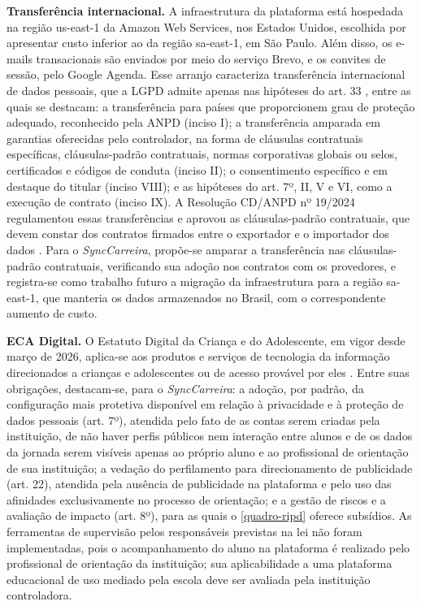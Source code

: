 \textbf{Transferência internacional.} A infraestrutura da plataforma está hospedada na região us-east-1 da Amazon Web Services, nos Estados Unidos, escolhida por apresentar custo inferior ao da região sa-east-1, em São Paulo. Além disso, os e-mails transacionais são enviados por meio do serviço Brevo, e os convites de sessão, pelo Google Agenda. Esse arranjo caracteriza transferência internacional de dados pessoais, que a LGPD admite apenas nas hipóteses do art. 33 \cite{brasil2018lgpd}, entre as quais se destacam: a transferência para países que proporcionem grau de proteção adequado, reconhecido pela ANPD (inciso I); a transferência amparada em garantias oferecidas pelo controlador, na forma de cláusulas contratuais específicas, cláusulas-padrão contratuais, normas corporativas globais ou selos, certificados e códigos de conduta (inciso II); o consentimento específico e em destaque do titular (inciso VIII); e as hipóteses do art. 7º, II, V e VI, como a execução de contrato (inciso IX). A Resolução CD/ANPD nº 19/2024 regulamentou essas transferências e aprovou as cláusulas-padrão contratuais, que devem constar dos contratos firmados entre o exportador e o importador dos dados \cite{anpd2024resolucao19}. Para o \textit{SyncCarreira}, propõe-se amparar a transferência nas cláusulas-padrão contratuais, verificando sua adoção nos contratos com os provedores, e registra-se como trabalho futuro a migração da infraestrutura para a região sa-east-1, que manteria os dados armazenados no Brasil, com o correspondente aumento de custo.

\textbf{ECA Digital.} O Estatuto Digital da Criança e do Adolescente, em vigor desde março de 2026, aplica-se aos produtos e serviços de tecnologia da informação direcionados a crianças e adolescentes ou de acesso provável por eles \cite{brasil2025lei15211}. Entre suas obrigações, destacam-se, para o \textit{SyncCarreira}: a adoção, por padrão, da configuração mais protetiva disponível em relação à privacidade e à proteção de dados pessoais (art. 7º), atendida pelo fato de as contas serem criadas pela instituição, de não haver perfis públicos nem interação entre alunos e de os dados da jornada serem visíveis apenas ao próprio aluno e ao profissional de orientação de sua instituição; a vedação do perfilamento para direcionamento de publicidade (art. 22), atendida pela ausência de publicidade na plataforma e pelo uso das afinidades exclusivamente no processo de orientação; e a gestão de riscos e a avaliação de impacto (art. 8º), para as quais o \autoref{quadro-ripd} oferece subsídios. As ferramentas de supervisão pelos responsáveis previstas na lei não foram implementadas, pois o acompanhamento do aluno na plataforma é realizado pelo profissional de orientação da instituição; sua aplicabilidade a uma plataforma educacional de uso mediado pela escola deve ser avaliada pela instituição controladora.
